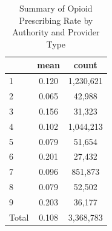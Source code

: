 \begin{table}[htbp]\centering
\def\sym#1{\ifmmode^{#1}\else\(^{#1}\)\fi}
\caption{Summary of Opioid Prescribing Rate by Authority and Provider Type}
\begin{tabular}{l*{1}{cc}}
\toprule
                    &        mean&       count\\
\midrule
1                   &       0.120&   1,230,621\\
2                   &       0.065&      42,988\\
3                   &       0.156&      31,323\\
4                   &       0.102&   1,044,213\\
5                   &       0.079&      51,654\\
6                   &       0.201&      27,432\\
7                   &       0.096&     851,873\\
8                   &       0.079&      52,502\\
9                   &       0.203&      36,177\\
Total               &       0.108&   3,368,783\\
\bottomrule
\end{tabular}
\end{table}
